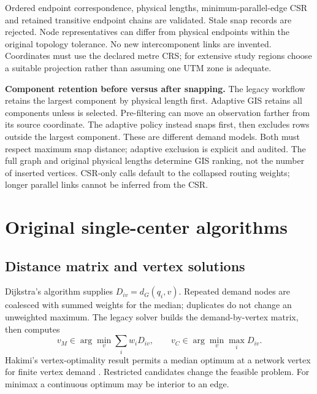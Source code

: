 \documentclass[11pt,a4paper]{article}
\newcommand{\code}[1]{\texttt{\detokenize{#1}}}
\newcommand{\dist}{d_G}
\begin{document}
Ordered endpoint correspondence, physical lengths, minimum-parallel-edge CSR and retained transitive endpoint chains are validated. Stale snap records are rejected. Node representatives can differ from physical endpoints within the original topology tolerance. No new intercomponent links are invented. Coordinates must use the declared metre CRS; for extensive study regions choose a suitable projection rather than assuming one UTM zone is adequate.

\textbf{Component retention before versus after snapping.} The legacy workflow retains the largest component by physical length first. Adaptive GIS retains all components unless \code{--keep-largest-component} is selected. Pre-filtering can move an observation farther from its source coordinate. The adaptive \code{largest} policy instead snaps first, then excludes rows outside the largest component. These are different demand models. Both must respect maximum snap distance; adaptive exclusion is explicit and audited. The full graph and original physical lengths determine GIS ranking, not the number of inserted vertices. CSR-only calls default to the collapsed routing weights; longer parallel links cannot be inferred from the CSR.
\section{Original single-center algorithms}
\subsection{Distance matrix and vertex solutions}
Dijkstra's algorithm \cite{dijkstra} supplies $D_{iv}=\dist(q_i,v)$. Repeated demand nodes are coalesced with summed weights for the median; duplicates do not change an unweighted maximum. The legacy solver builds the demand-by-vertex matrix, then computes
\[
 v_M\in\arg\min_v\sum_iw_iD_{iv},\qquad v_C\in\arg\min_v\max_iD_{iv}.
\]
Hakimi's vertex-optimality result permits a median optimum at a network vertex for finite vertex demand \cite{hakimi64,hakimi65}. Restricted candidates change the feasible problem. For minimax a continuous optimum may be interior to an edge.
\end{document}
